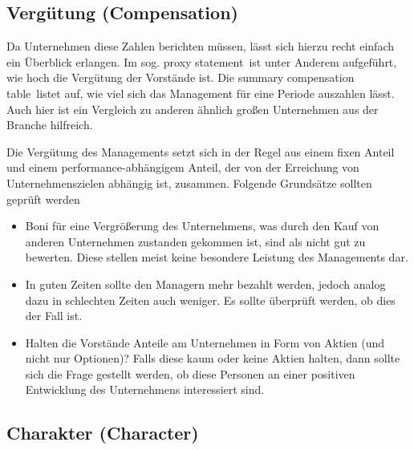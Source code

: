 %
\subsection{Vergütung (Compensation)}

Da Unternehmen diese Zahlen berichten müssen, lässt sich hierzu recht einfach ein Überblick erlangen.
Im sog. \glqq proxy statement\grqq\ ist unter Anderem aufgeführt, wie hoch die Vergütung der Vorstände ist.
Die \glqq summary compensation table\grqq\ listet auf, wie viel sich das Management für eine Periode auszahlen lässt.
Auch hier ist ein Vergleich zu anderen ähnlich großen Unternehmen aus der Branche hilfreich.

Die Vergütung des Managements setzt sich in der Regel aus einem fixen Anteil und einem performance-abhängigem Anteil, der von der Erreichung von Unternehmenszielen abhängig ist, zusammen.
Folgende Grundsätze sollten geprüft werden
\begin{itemize}
    \item Boni für eine Vergrößerung des Unternehmens, was durch den Kauf von anderen Unternehmen zustanden gekommen ist, sind als nicht gut zu bewerten.
        Diese stellen meist keine besondere Leistung des Managements dar.
    \item In guten Zeiten sollte den Managern mehr bezahlt werden, jedoch analog dazu in schlechten Zeiten auch weniger. Es sollte überprüft werden, ob dies der Fall ist.
    \item Halten die Vorstände Anteile am Unternehmen in Form von Aktien (und nicht nur Optionen)? 
        Falls diese kaum oder keine Aktien halten, dann sollte sich die Frage gestellt werden, ob diese Personen an einer positiven Entwicklung des Unternehmens interessiert sind.
\end{itemize}

%
\subsection{Charakter (Character)}

